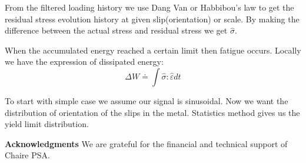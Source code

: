 \documentclass[3p,times,procedia,number]{elsarticle}
\begin{document}
From the filtered loading history we use Dang Van or Habbibou's law to get the residual stress evolution history at given slip(orientation) or scale. By making the difference between the actual stress and residual stress we get $\hat{\sigma}$. 

When the accumulated energy reached a certain limit then fatigue occurs. Locally we have the expression of dissipated energy:
$$\Delta W\doteq\int\hat{\sigma}:\hat{\varepsilon}dt$$

To start with simple case we assume our signal is sinusoidal. Now we want the distribution of orientation of the slips in the metal. Statistics method gives us the yield limit distribution.


\vspace{6pt}
\noindent
\textbf{Acknowledgments}
\vspace{6pt}
We are grateful for the financial and technical support of Chaire PSA.


\clearpage




\clearpage
\appendix
\appendixpage
{}
%	
%	
%	    
%	
%	
\end{document}
